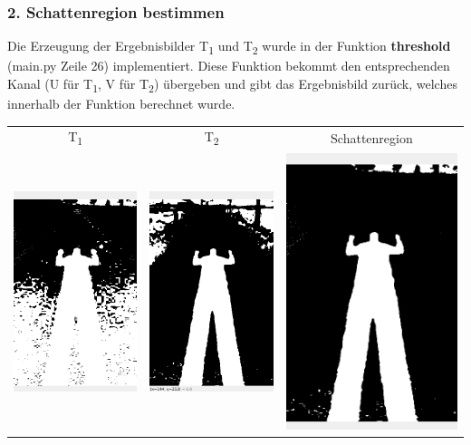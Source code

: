 \documentclass[12pt]{article}
\begin{document}
\subsubsection*{2. Schattenregion bestimmen}
Die Erzeugung der Ergebnisbilder T\textsubscript{1} und T\textsubscript{2} wurde in der Funktion \textbf{threshold} (main.py Zeile 26) implementiert. Diese Funktion bekommt den entsprechenden Kanal (U für T\textsubscript{1}, V für T\textsubscript{2}) übergeben und gibt das Ergebnisbild zurück, welches innerhalb der Funktion berechnet wurde.
\begin{tabular}{c | c | c}
  T\textsubscript{1} & T\textsubscript{2} & Schattenregion \\
  \includegraphics[width=.3\linewidth]{t1.png} & \includegraphics[width=.3\linewidth]{t2.png} & \includegraphics[width=.3\linewidth]{s.png}
\end{tabular}
\end{document}
